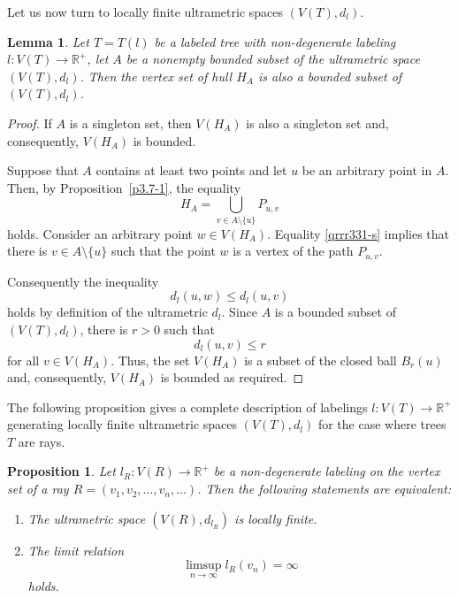 \documentclass[pdflatex,sn-mathphys-num]{sn-jnl}%
\newtheorem{proposition}{Proposition}%
\newtheorem{lemma}{Lemma}%
\theoremstyle{thmstyletwo}%
\begin{document}
Let us now turn to locally finite ultrametric spaces $(V(T), d_l)$.



\begin{lemma}\label{ljhg35}
Let $T = T(l)$ be a labeled tree with non-degenerate labeling $l \colon V(T) \to \mathbb{R}^+$, let $A$ be a nonempty bounded subset of the ultrametric space $(V(T), d_l)$. 
Then the vertex set of hull $H_A$ is also a bounded subset of $(V(T), d_l)$.
\end{lemma}


\begin{proof}

If $A$ is a singleton set, then $V(H_A)$ is also a singleton set and, consequently, $V(H_A)$ is bounded.

Suppose that $A$ contains at least two points and let $u$ be an arbitrary point in $A$.
Then, by Proposition~\ref{p3.7-1}, the equality
\begin{equation}\label{qrrr331-s}
H_A = \bigcup_{v \in A \setminus \{u\}} P_{u,v}
\end{equation}
holds. Consider an arbitrary point $w \in V(H_A)$. Equality \eqref{qrrr331-s} implies that there is $v \in A \setminus \{u\}$ such that the point $w$ is a vertex of the path $P_{u,v}$.

Consequently the inequality
\begin{equation}\label{stad1}
d_l(u, w) \leq d_l(u, v)
\end{equation}
holds by definition of the ultrametric $d_l$. Since $A$ is a bounded subset of $(V(T), d_l)$, there is $r > 0$ such that
\begin{equation}\label{stad2}
d_l(u, v) \leq r 
\end{equation}
for all $v \in V(H_A)$. Thus, the set $V(H_A)$ is a subset of the closed ball $B_r(u)$ and, consequently, $V(H_A)$ is bounded as required.

\end{proof}









The following proposition gives a complete description of labelings $l \colon V(T) \to \mathbb{R}^+$ generating locally finite ultrametric spaces $(V(T), d_l)$ for the case where trees $T$ are rays.


\begin{proposition}\label{52dcij}
Let $l_R\colon V(R) \to \mathbb{R}^+$ be a non-degenerate labeling on the vertex set of a ray $R = (v_1, v_2, \ldots, v_n, \ldots)$. Then the following statements are equivalent:

\begin{enumerate}[label=\textit{(\roman*)}, left=0pt]
\item The ultrametric space $(V(R), d_{l_R})$ is locally finite.

\item The limit relation
\begin{equation}\label{tghuaa}
\limsup_{n \to \infty} l_R(v_n) = \infty 
\end{equation}
holds.
\end{enumerate}
\end{proposition}
\end{document}
